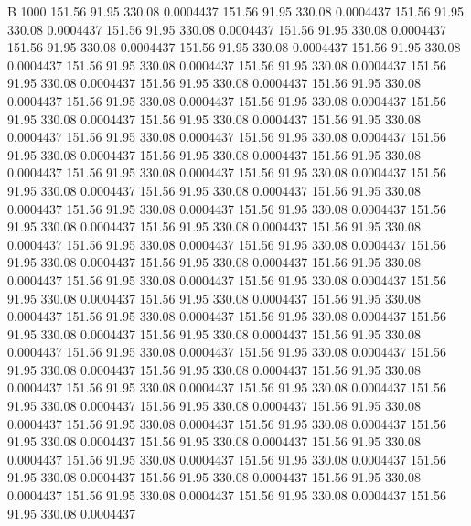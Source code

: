 


B 1000
 151.56   91.95  330.08   0.0004437
 151.56   91.95  330.08   0.0004437
 151.56   91.95  330.08   0.0004437
 151.56   91.95  330.08   0.0004437
 151.56   91.95  330.08   0.0004437
 151.56   91.95  330.08   0.0004437
 151.56   91.95  330.08   0.0004437
 151.56   91.95  330.08   0.0004437
 151.56   91.95  330.08   0.0004437
 151.56   91.95  330.08   0.0004437
 151.56   91.95  330.08   0.0004437
 151.56   91.95  330.08   0.0004437
 151.56   91.95  330.08   0.0004437
 151.56   91.95  330.08   0.0004437
 151.56   91.95  330.08   0.0004437
 151.56   91.95  330.08   0.0004437
 151.56   91.95  330.08   0.0004437
 151.56   91.95  330.08   0.0004437
 151.56   91.95  330.08   0.0004437
 151.56   91.95  330.08   0.0004437
 151.56   91.95  330.08   0.0004437
 151.56   91.95  330.08   0.0004437
 151.56   91.95  330.08   0.0004437
 151.56   91.95  330.08   0.0004437
 151.56   91.95  330.08   0.0004437
 151.56   91.95  330.08   0.0004437
 151.56   91.95  330.08   0.0004437
 151.56   91.95  330.08   0.0004437
 151.56   91.95  330.08   0.0004437
 151.56   91.95  330.08   0.0004437
 151.56   91.95  330.08   0.0004437
 151.56   91.95  330.08   0.0004437
 151.56   91.95  330.08   0.0004437
 151.56   91.95  330.08   0.0004437
 151.56   91.95  330.08   0.0004437
 151.56   91.95  330.08   0.0004437
 151.56   91.95  330.08   0.0004437
 151.56   91.95  330.08   0.0004437
 151.56   91.95  330.08   0.0004437
 151.56   91.95  330.08   0.0004437
 151.56   91.95  330.08   0.0004437
 151.56   91.95  330.08   0.0004437
 151.56   91.95  330.08   0.0004437
 151.56   91.95  330.08   0.0004437
 151.56   91.95  330.08   0.0004437
 151.56   91.95  330.08   0.0004437
 151.56   91.95  330.08   0.0004437
 151.56   91.95  330.08   0.0004437
 151.56   91.95  330.08   0.0004437
 151.56   91.95  330.08   0.0004437
 151.56   91.95  330.08   0.0004437
 151.56   91.95  330.08   0.0004437
 151.56   91.95  330.08   0.0004437
 151.56   91.95  330.08   0.0004437
 151.56   91.95  330.08   0.0004437
 151.56   91.95  330.08   0.0004437
 151.56   91.95  330.08   0.0004437
 151.56   91.95  330.08   0.0004437
 151.56   91.95  330.08   0.0004437
 151.56   91.95  330.08   0.0004437
 151.56   91.95  330.08   0.0004437
 151.56   91.95  330.08   0.0004437
 151.56   91.95  330.08   0.0004437
 151.56   91.95  330.08   0.0004437
 151.56   91.95  330.08   0.0004437
 151.56   91.95  330.08   0.0004437
 151.56   91.95  330.08   0.0004437
 151.56   91.95  330.08   0.0004437
 151.56   91.95  330.08   0.0004437
 151.56   91.95  330.08   0.0004437
 151.56   91.95  330.08   0.0004437
